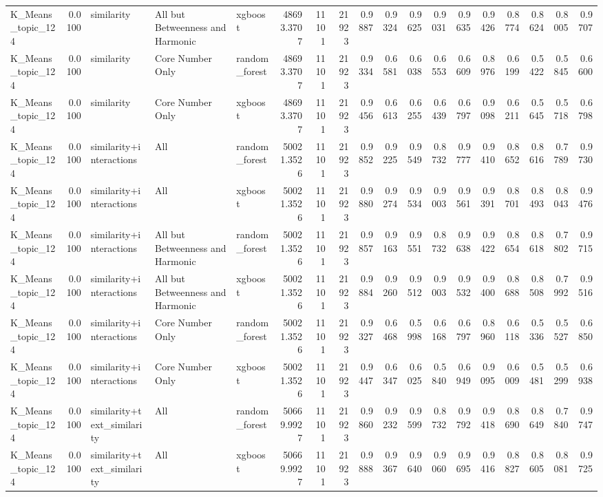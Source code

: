 \begin{tabular}{lrlllrrrrrrrrrrrrr}
K_Means_topic_124 & 0.0100 & similarity & All but Betweenness and Harmonic & xgboost & 48693.3707 & 11101 & 21923 & 0.9887 & 0.9324 & 0.9625 & 0.9031 & 0.9635 & 0.9426 & 0.8774 & 0.8624 & 0.8005 & 0.9707 \\
K_Means_topic_124 & 0.0100 & similarity & Core Number Only & random_forest & 48693.3707 & 11101 & 21923 & 0.9334 & 0.6581 & 0.6038 & 0.6553 & 0.6609 & 0.8976 & 0.6199 & 0.5422 & 0.5845 & 0.6600 \\
K_Means_topic_124 & 0.0100 & similarity & Core Number Only & xgboost & 48693.3707 & 11101 & 21923 & 0.9456 & 0.6613 & 0.6255 & 0.6439 & 0.6797 & 0.9098 & 0.6211 & 0.5645 & 0.5718 & 0.6798 \\
K_Means_topic_124 & 0.0100 & similarity+interactions & All & random_forest & 50021.3526 & 11101 & 21923 & 0.9852 & 0.9225 & 0.9549 & 0.8732 & 0.9777 & 0.9410 & 0.8652 & 0.8616 & 0.7789 & 0.9730 \\
K_Means_topic_124 & 0.0100 & similarity+interactions & All & xgboost & 50021.3526 & 11101 & 21923 & 0.9880 & 0.9274 & 0.9534 & 0.9003 & 0.9561 & 0.9391 & 0.8701 & 0.8493 & 0.8043 & 0.9476 \\
K_Means_topic_124 & 0.0100 & similarity+interactions & All but Betweenness and Harmonic & random_forest & 50021.3526 & 11101 & 21923 & 0.9857 & 0.9163 & 0.9551 & 0.8732 & 0.9638 & 0.9422 & 0.8654 & 0.8618 & 0.7802 & 0.9715 \\
K_Means_topic_124 & 0.0100 & similarity+interactions & All but Betweenness and Harmonic & xgboost & 50021.3526 & 11101 & 21923 & 0.9884 & 0.9260 & 0.9512 & 0.9003 & 0.9532 & 0.9400 & 0.8688 & 0.8508 & 0.7992 & 0.9516 \\
K_Means_topic_124 & 0.0100 & similarity+interactions & Core Number Only & random_forest & 50021.3526 & 11101 & 21923 & 0.9327 & 0.6468 & 0.5998 & 0.6168 & 0.6797 & 0.8960 & 0.6118 & 0.5336 & 0.5527 & 0.6850 \\
K_Means_topic_124 & 0.0100 & similarity+interactions & Core Number Only & xgboost & 50021.3526 & 11101 & 21923 & 0.9447 & 0.6347 & 0.6025 & 0.5840 & 0.6949 & 0.9095 & 0.6009 & 0.5481 & 0.5299 & 0.6938 \\
K_Means_topic_124 & 0.0100 & similarity+text_similarity & All & random_forest & 50669.9927 & 11101 & 21923 & 0.9860 & 0.9232 & 0.9599 & 0.8732 & 0.9792 & 0.9418 & 0.8690 & 0.8649 & 0.7840 & 0.9747 \\
K_Means_topic_124 & 0.0100 & similarity+text_similarity & All & xgboost & 50669.9927 & 11101 & 21923 & 0.9888 & 0.9367 & 0.9640 & 0.9060 & 0.9695 & 0.9416 & 0.8827 & 0.8605 & 0.8081 & 0.9725 \\

\end{tabular}
